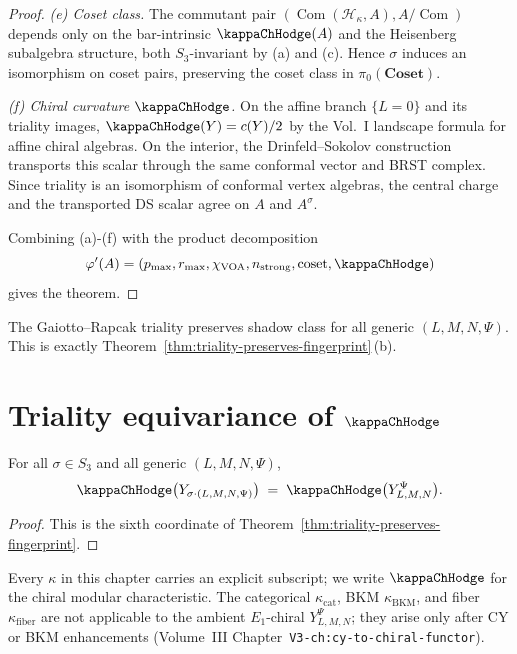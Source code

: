 \begin{proof}
\smallskip
\emph{(e) Coset class.} The commutant pair
$(\operatorname{Com}(\mathcal{H}_\kappa, A), A/\operatorname{Com})$
depends only on the bar-intrinsic $\kappaChHodge(A)$ and the
Heisenberg subalgebra structure, both $S_3$-invariant by (a) and (c).
Hence $\sigma$ induces an isomorphism on coset pairs, preserving
the coset class in
$\pi_0(\mathbf{Coset})$.

\smallskip
\emph{(f) Chiral curvature $\kappaChHodge$.}
On the affine branch $\{L=0\}$ and its triality images,
$\kappaChHodge(Y)=c(Y)/2$ by the Vol.~I landscape formula for
affine chiral algebras. On the interior, the Drinfeld--Sokolov
construction transports this scalar through the same conformal vector
and BRST complex. Since triality is an isomorphism of conformal vertex
algebras, the central charge and the transported DS scalar agree on
$A$ and $A^\sigma$.

\smallskip
Combining (a)-(f) with
the product decomposition
\[
\varphi'(A) = (p_{\max}, r_{\max}, \chi_{\mathrm{VOA}},
n_{\mathrm{strong}}, \mathrm{coset}, \kappaChHodge)
\]
gives the theorem.
\end{proof}

\begin{corollary}
\label{cor:triality-shadow-class}
The Gaiotto--Rapcak triality preserves shadow class for all
generic $(L,M,N,\Psi)$. This is exactly
Theorem~\ref{thm:triality-preserves-fingerprint}\,(b).
\end{corollary}

\section{Triality equivariance of $\kappaChHodge$}
\label{sec:triality-kappa}

\begin{theorem}
\label{thm:triality-preserves-kappa}
For all $\sigma \in S_3$ and all generic $(L,M,N,\Psi)$,
\[
\kappaChHodge\bigl(Y_{\sigma\cdot(L,M,N,\Psi)}\bigr)
\;=\;
\kappaChHodge\bigl(Y_{L,M,N}^\Psi\bigr).
\]
\end{theorem}

\begin{proof}
This is the sixth coordinate of
Theorem~\ref{thm:triality-preserves-fingerprint}.
\end{proof}

\begin{remark}
\label{rem:kappa-subscript-y-algebra}
Every $\kappa$ in this chapter carries an explicit subscript; we
write $\kappaChHodge$ for the chiral modular characteristic.
The categorical $\kappa_{\mathrm{cat}}$, BKM $\kappa_{\mathrm{BKM}}$,
and fiber $\kappa_{\mathrm{fiber}}$ are not applicable to the ambient
$E_1$-chiral $Y_{L,M,N}^\Psi$; they arise only after CY or BKM
enhancements (Volume~III Chapter~\texttt{V3-ch:cy-to-chiral-functor}).
\end{remark}

